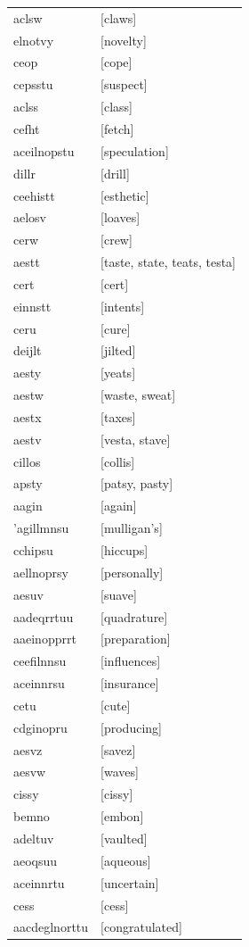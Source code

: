 \documentclass{article}
\begin{document}
\begin{tabular}{ll}
aclsw & [claws] \\
elnotvy & [novelty] \\
ceop & [cope] \\
cepsstu & [suspect] \\
aclss & [class] \\
cefht & [fetch] \\
aceilnopstu & [speculation] \\
dillr & [drill] \\
ceehistt & [esthetic] \\
aelosv & [loaves] \\
cerw & [crew] \\
aestt & [taste, state, teats, testa] \\
cert & [cert] \\
einnstt & [intents] \\
ceru & [cure] \\
deijlt & [jilted] \\
aesty & [yeats] \\
aestw & [waste, sweat] \\
aestx & [taxes] \\
aestv & [vesta, stave] \\
cillos & [collis] \\
apsty & [patsy, pasty] \\
aagin & [again] \\
'agillmnsu & [mulligan's] \\
cchipsu & [hiccups] \\
aellnoprsy & [personally] \\
aesuv & [suave] \\
aadeqrrtuu & [quadrature] \\
aaeinopprrt & [preparation] \\
ceefilnnsu & [influences] \\
aceinnrsu & [insurance] \\
cetu & [cute] \\
cdginopru & [producing] \\
aesvz & [savez] \\
aesvw & [waves] \\
cissy & [cissy] \\
bemno & [embon] \\
adeltuv & [vaulted] \\
aeoqsuu & [aqueous] \\
aceinnrtu & [uncertain] \\
cess & [cess] \\
aacdeglnorttu & [congratulated] \\

\end{tabular}
\end{document}

